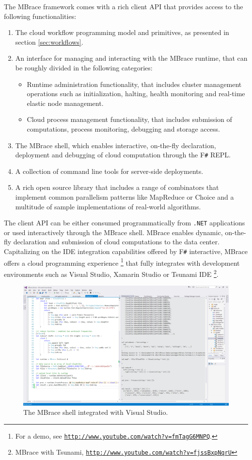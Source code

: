 \documentclass[9pt,a4paper]{article}
\newcommand{\mbrace}{MBrace}
\newcommand{\Mbrace}{MBrace}
\newcommand{\fsharp}{F\texttt \#}
\newcommand{\dotnet}{\texttt{\hbox{.}NET}}
\newcommand{\samehref}[1]{\href{#1}{\texttt{#1}}}
\begin{document}
The \mbrace{} framework comes with a rich client API that provides access to the 
following functionalities:
\begin{enumerate}
\item The cloud workflow programming model and primitives, as presented in section
\ref{sec:workflows}.
\item An interface for managing and interacting with the \mbrace{} runtime, 
that can be roughly divided in the following categories:
	\begin{itemize}
		\item Runtime administration functionality, that includes cluster management
		operations such as initialization, halting, health monitoring and
		real-time elastic node management.
		\item Cloud process management functionality, that includes submission of
		computations, process monitoring, debugging and storage access.
	\end{itemize}

\item The \mbrace{} shell, which enables interactive, on-the-fly declaration,
deployment and debugging of cloud computation through the \fsharp{} REPL.
\item A collection of command line tools for server-side deployments.
\item A rich open source library that includes a range of combinators that
implement common parallelism patterns like MapReduce or Choice and a multitude of 
sample implementations of real-world algorithms.
\end{enumerate}
%
The client API can be either consumed programmatically from \dotnet{} applications
or used interactively through the \mbrace{} shell.
\Mbrace{} enables dynamic, on-the-fly declaration and submission of cloud 
computations to the data center. Capitalizing on the IDE integration capabilities 
offered by \fsharp{} interactive, \mbrace{} offers a cloud programming experience%
\footnote{For a demo, see \samehref{http://www.youtube.com/watch?v=fmTagG6MNPQ}.}
that fully integrates with development environments such as Visual Studio,
Xamarin Studio or Tsunami IDE%
\footnote{\mbrace{} with Tsunami, \samehref{http://www.youtube.com/watch?v=fjssBxpNqrU}}.

\begin{figure}[ht]
\label{shellfig}
\centering
\includegraphics[width=\textwidth]{shell2.png}
\caption{The \Mbrace{} shell integrated with Visual Studio.}
\end{figure}
\end{document}
